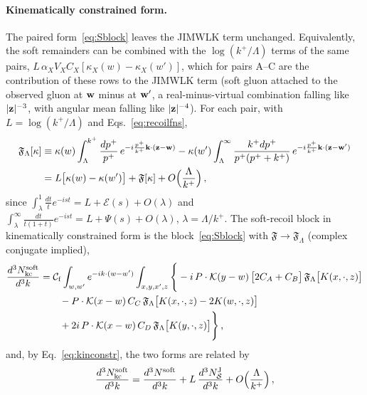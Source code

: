\paragraph{Kinematically constrained form.} The paired form~\eqref{eq:Sblock} leaves the JIMWLK term unchanged. Equivalently, the soft remainders can be combined with the $\log(k^+/\Lambda)$ terms of the same pairs, $L\,\alpha_XV_XC_X[\kappa_X(w)-\kappa_X(w')]$, which for pairs A--C are the contribution of these rows to the JIMWLK term (soft gluon attached to the observed gluon at $\mathbf{w}$ minus at $\mathbf{w}'$, a real-minus-virtual combination falling like $|\mathbf{z}|^{-3}$, with angular mean falling like $|\mathbf{z}|^{-4}$). For each pair, with $L=\log(k^+/\Lambda)$ and Eqs.~\eqref{eq:recoilfns},
\begin{align}\label{eq:kinconstr}
\mathfrak F_\Lambda[\kappa]&\equiv\kappa(w)\int_\Lambda^{k^+}\frac{dp^+}{p^+}\,e^{-i\frac{p^+}{k^+}\mathbf{k}\cdot(\mathbf{z}-\mathbf{w})}-\kappa(w')\int_\Lambda^\infty\frac{k^+dp^+}{p^+(p^++k^+)}\,e^{-i\frac{p^+}{k^+}\mathbf{k}\cdot(\mathbf{z}-\mathbf{w}')}\notag\\
&=L\big[\kappa(w)-\kappa(w')\big]+\mathfrak F[\kappa]+O\Big(\frac{\Lambda}{k^+}\Big)\,,
\end{align}
since $\int_\lambda^1\frac{dt}{t}e^{-ist}=L+\mathcal E(s)+O(\lambda)$ and $\int_\lambda^\infty\frac{dt}{t(1+t)}e^{-ist}=L+\Psi(s)+O(\lambda)$, $\lambda=\Lambda/k^+$. The soft-recoil block in kinematically constrained form is the block~\eqref{eq:Sblock} with $\mathfrak F\to\mathfrak F_\Lambda$ (complex conjugate implied),
\begin{align}\label{eq:Sblockkc}
\frac{d^3N^{\rm soft}_{\rm kc}}{d^3k}&=\mathcal C_{\rm f}\int_{w,w'}e^{-ik\cdot(w-w')}\int_{x,y,x',z}\Bigg\{-i\,P\cdot\mathcal{K}(y-w)\,\big[2C_A+C_B\big]\,\mathfrak F_\Lambda\big[K(x,\cdot,z)\big]\notag\\
&\qquad-P\cdot\mathcal{K}(x-w)\,C_C\,\mathfrak F_\Lambda\big[K(x,\cdot,z)-2K(w,\cdot,z)\big]\notag\\&\qquad+2i\,P\cdot\mathcal{K}(x-w)\,C_D\,\mathfrak F_\Lambda\big[K(y,\cdot,z)\big]\Bigg\}\,,
\end{align}
and, by Eq.~\eqref{eq:kinconstr}, the two forms are related by
\begin{align}\label{eq:kcequiv}
\frac{d^3N^{\rm soft}_{\rm kc}}{d^3k}=\frac{d^3N^{\rm soft}}{d^3k}+L\,\frac{d^3N^{\rm J}_{\mathcal S}}{d^3k}+O\Big(\frac{\Lambda}{k^+}\Big)\,,
\end{align}
